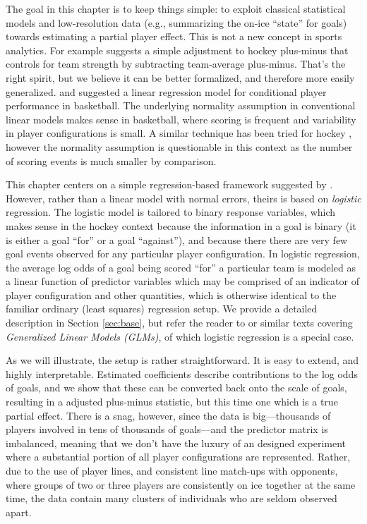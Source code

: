 The goal in this chapter is to keep things simple: to exploit classical
statistical models and low-resolution data (e.g., summarizing the on-ice
``state'' for goals) towards estimating a partial player effect.  This is not a
new concept in sports analytics.  For example \cite{awa09} suggests a simple
adjustment to hockey plus-minus that controls for team strength by subtracting
team-average plus-minus.  That's the right spirit, but we believe it can be
better formalized, and therefore more easily generalized.  \cite{ros04} and
\cite{ilabar08} suggested a linear regression model for conditional player
performance in basketball.  The underlying normality assumption in
conventional linear models makes sense in basketball, where scoring is
frequent and variability in player configurations is small.  A similar
technique has been tried for hockey \cite{mac10}, however the normality
assumption is questionable in this context as the number of scoring events is
much smaller by comparison.

This chapter centers on a simple regression-based framework suggested by
\cite{gramacy:jensen:taddy:2013}.  However, rather than a linear model
with normal errors, theirs is based on {\em logistic} regression.  The
logistic model is tailored to binary response variables, which makes sense in
the hockey context because the information in a goal is binary (it is either a
goal ``for'' or a goal ``against''), and because there there are very few goal
events observed for any particular player configuration.  In logistic
regression, the average log odds of a goal being scored ``for'' a particular
team  is modeled as a linear function of predictor variables which may be
comprised of an indicator of player configuration and other quantities, which
is otherwise identical to the familiar ordinary (least squares) regression
setup.  We provide a detailed description in Section \ref{sec:base}, but refer
the reader to \cite{sheather:2009} or similar texts covering {\em Generalized Linear
Models (GLMs)}, of which logistic regression is a special case.

As we will illustrate, the setup is rather straightforward.  It is easy to
extend, and highly interpretable.  Estimated coefficients describe
contributions to the log odds of goals, and we show that these can be
converted back onto the scale of goals, resulting in a adjusted plus-minus
statistic, but this time one which is a true partial effect.  There is a snag,
however, since the data is big---thousands of players involved in tens of
thousands of goals---and the predictor matrix is imbalanced, meaning that we
don't have the luxury of an designed experiment where a substantial portion of
all player configurations are represented.  Rather, due to the use of player
lines, and consistent line match-ups with opponents, where groups of two or
three players are consistently on ice together at the same time, the data
contain many clusters of individuals who are seldom observed apart. 

